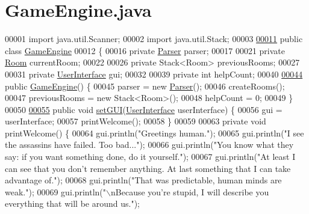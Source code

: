 \hypertarget{GameEngine_8java_source}{\section{Game\-Engine.\-java}
}

\begin{DoxyCode}
00001 \textcolor{keyword}{import} java.util.Scanner;
00002 \textcolor{keyword}{import} java.util.Stack;
00003 
\hypertarget{GameEngine_8java_source_l00011}{}\hyperlink{classGameEngine}{00011} \textcolor{keyword}{public} \textcolor{keyword}{class }\hyperlink{classGameEngine}{GameEngine}
00012 \{
00016     \textcolor{keyword}{private} \hyperlink{classParser}{Parser} parser;
00017 
00021     \textcolor{keyword}{private} \hyperlink{classRoom}{Room} currentRoom;
00022 
00026     \textcolor{keyword}{private} Stack<Room> previousRooms;
00027 
00031     \textcolor{keyword}{private} \hyperlink{classUserInterface}{UserInterface} gui;
00032 
00039     \textcolor{keyword}{private} \textcolor{keywordtype}{int} helpCount;
00040 
\hypertarget{GameEngine_8java_source_l00044}{}\hyperlink{classGameEngine_a9e8a92f5021a34293060f9aaff4005de}{00044}     \textcolor{keyword}{public} \hyperlink{classGameEngine_a9e8a92f5021a34293060f9aaff4005de}{GameEngine}() \{
00045         parser = \textcolor{keyword}{new} \hyperlink{classParser}{Parser}();
00046         createRooms();
00047         previousRooms = \textcolor{keyword}{new} Stack<Room>();
00048         helpCount = 0;
00049     \}
00050 
\hypertarget{GameEngine_8java_source_l00055}{}\hyperlink{classGameEngine_aec901a5b590b3cd204f196165da5dfb6}{00055}     \textcolor{keyword}{public} \textcolor{keywordtype}{void} \hyperlink{classGameEngine_aec901a5b590b3cd204f196165da5dfb6}{setGUI}(\hyperlink{classUserInterface}{UserInterface} userInterface) \{
00056         gui = userInterface;
00057         printWelcome();
00058     \}
00059 
00063     \textcolor{keyword}{private} \textcolor{keywordtype}{void} printWelcome() \{
00064         gui.println(\textcolor{stringliteral}{"Greetings human."});
00065         gui.println(\textcolor{stringliteral}{"I see the assassins have failed. Too bad..."});
00066         gui.println(\textcolor{stringliteral}{"You know what they say: if you want something done, do it yourself."});
00067         gui.println(\textcolor{stringliteral}{"At least I can see that you don't remember anything. At last something that I can take
       advantage of."});
00068         gui.println(\textcolor{stringliteral}{"That was predictable, human minds are weak."});
00069         gui.println(\textcolor{stringliteral}{"\(\backslash\)nBecause you're stupid, I will describe you everything that will be around us."});

\end{DoxyCode}

